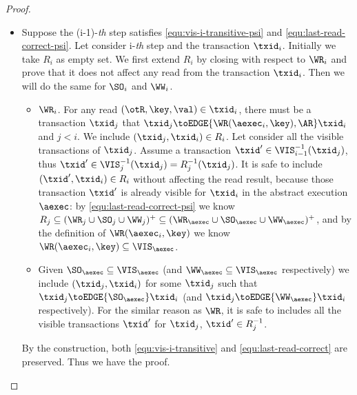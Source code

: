 \begin{proof}
\begin{itemize}
    \item {}
    Suppose the (i-1)-\emph{th} step satisfies \cref{equ:vis-i-transitive-psi} and \cref{equ:last-read-correct-psi}.
    Let consider i-\emph{th} step and the transaction \( \txid_i \).
    Initially we take \( R_i \) as empty set.
    We first extend \( R_i \) by closing with respect to \( \WR_i \)
    and prove that it does not affect any read from the transaction \( \txid_i \).
    Then we will do the same for \( \SO_i \) and \( \WW_i \).
    \begin{itemize}
        \item \( \WR_i\). For any read \( (\otR, \key, \val ) \in \txid_i \),
        there must be a transaction \( \txid_j \) that \( \txid_j \toEDGE{\WR(\aexec_i,\key), \AR} \txid_i \) and \( j < i \).
        We include \( (\txid_j, \txid_i) \in R_i \).
        Let consider all the visible transactions of \( \txid_j \).
        Assume a transaction \( \txid' \in \VIS_{i-1}^{-1}(\txid_j) \), 
        thus \( \txid' \in \VIS_{j}^{-1}(\txid_j) = R_j^{-1}(\txid_j) \).
        It is safe to include \( (\txid', \txid_i) \in R_i \) without affecting the read result,
        because those transaction \( \txid' \) is already visible for \( \txid_i \) in the abstract execution \( \aexec \):
        by \cref{equ:last-read-correct-psi} we know \( R_j \subseteq (\WR_j \cup \SO_j \cup \WW_j)^{+} \subseteq (\WR_\aexec \cup \SO_\aexec \cup \WW_\aexec)^{+}\),
        and by the definition of \( \WR(\aexec_i,\key) \) we know \( \WR(\aexec_i,\key) \subseteq \VIS_\aexec\).

    \item Given \( \SO_\aexec \subseteq \VIS_\aexec \) (and \( \WW_\aexec \subseteq \VIS_\aexec \) respectively) we include \( (\txid_j,\txid_i) \) for some \( \txid_j \)
        such that \( \txid_j \toEDGE{\SO_\aexec} \txid_i\) (and \( \txid_j \toEDGE{\WW_\aexec} \txid_i \) respectively).
        For the similar reason as \( \WR \),
        it is safe to includes all the visible transactions \( \txid' \) for \( \txid_j \), \ie \( \txid' \in R_j^{-1}\).
        \end{itemize}
        
    By the construction, both \cref{equ:vis-i-transitive} and \cref{equ:last-read-correct} are preserved. 
    Thus we have the proof.
    \end{itemize}
\end{proof}

